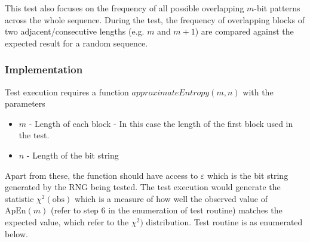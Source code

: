 This test also focuses on the frequency of all possible overlapping $m$-bit patterns across the whole sequence. During the test, the frequency of overlapping blocks of two adjacent/consecutive lengths (e.g. $m$ and $m+1$) are compared against the expected result for a random sequence. 

\subsubsection{Implementation}

Test execution requires a function $approximateEntropy(m,n)$ with the parameters

\begin{itemize}
    \item $m$ - Length of each block - In this case the length of the first block used in the test.
    \item $n$ - Length of the bit string
\end{itemize}

Apart from these, the function should have access to $\varepsilon$ which is the bit string generated by the RNG being tested. The test execution would generate the statistic $\chi^2(\text{obs})$ which is a measure of how well the observed value of $\text{ApEn}(m)$ (refer to step 6 in the enumeration of test routine) matches the expected value, which refer to the $\chi^2)$ distribution. Test routine is as enumerated below.

